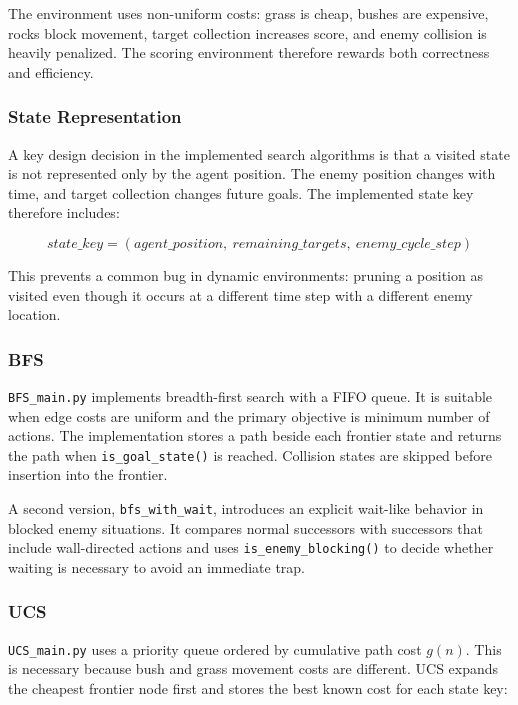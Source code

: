 \documentclass[11pt,a4paper]{article}
\newcommand{\code}[1]{\texttt{#1}}
\begin{document}
The environment uses non-uniform costs: grass is cheap, bushes are expensive, rocks block movement, target collection increases score, and enemy collision is heavily penalized. The scoring environment therefore rewards both correctness and efficiency.

\subsubsection{State Representation}

A key design decision in the implemented search algorithms is that a visited state is not represented only by the agent position. The enemy position changes with time, and target collection changes future goals. The implemented state key therefore includes:

\begin{equation}
    state\_key = (agent\_position,\ remaining\_targets,\ enemy\_cycle\_step)
\end{equation}

This prevents a common bug in dynamic environments: pruning a position as visited even though it occurs at a different time step with a different enemy location.

\subsubsection{BFS}

\code{BFS\_main.py} implements breadth-first search with a FIFO queue. It is suitable when edge costs are uniform and the primary objective is minimum number of actions. The implementation stores a path beside each frontier state and returns the path when \code{is\_goal\_state()} is reached. Collision states are skipped before insertion into the frontier.

A second version, \code{bfs\_with\_wait}, introduces an explicit wait-like behavior in blocked enemy situations. It compares normal successors with successors that include wall-directed actions and uses \code{is\_enemy\_blocking()} to decide whether waiting is necessary to avoid an immediate trap.

\subsubsection{UCS}

\code{UCS\_main.py} uses a priority queue ordered by cumulative path cost \(g(n)\). This is necessary because bush and grass movement costs are different. UCS expands the cheapest frontier node first and stores the best known cost for each state key:
\end{document}
